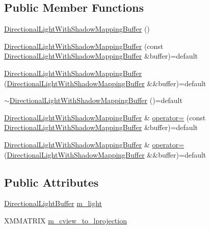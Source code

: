 \subsection*{Public Member Functions}
\begin{DoxyCompactItemize}
\item 
\hyperlink{structmage_1_1_directional_light_with_shadow_mapping_buffer_a4657f8c201fda21988dea072c70615bb}{Directional\+Light\+With\+Shadow\+Mapping\+Buffer} ()
\item 
\hyperlink{structmage_1_1_directional_light_with_shadow_mapping_buffer_afc29c8403c453f50181ac8675cf89407}{Directional\+Light\+With\+Shadow\+Mapping\+Buffer} (const \hyperlink{structmage_1_1_directional_light_with_shadow_mapping_buffer}{Directional\+Light\+With\+Shadow\+Mapping\+Buffer} \&buffer)=default
\item 
\hyperlink{structmage_1_1_directional_light_with_shadow_mapping_buffer_aacd039c19b590d9d238ed1ec90d25721}{Directional\+Light\+With\+Shadow\+Mapping\+Buffer} (\hyperlink{structmage_1_1_directional_light_with_shadow_mapping_buffer}{Directional\+Light\+With\+Shadow\+Mapping\+Buffer} \&\&buffer)=default
\item 
\hyperlink{structmage_1_1_directional_light_with_shadow_mapping_buffer_aaf69f9a370b547844fe51ccebc791876}{$\sim$\+Directional\+Light\+With\+Shadow\+Mapping\+Buffer} ()=default
\item 
\hyperlink{structmage_1_1_directional_light_with_shadow_mapping_buffer}{Directional\+Light\+With\+Shadow\+Mapping\+Buffer} \& \hyperlink{structmage_1_1_directional_light_with_shadow_mapping_buffer_a9a166d9ce2e74442b98e0d02bcbf18b8}{operator=} (const \hyperlink{structmage_1_1_directional_light_with_shadow_mapping_buffer}{Directional\+Light\+With\+Shadow\+Mapping\+Buffer} \&buffer)=default
\item 
\hyperlink{structmage_1_1_directional_light_with_shadow_mapping_buffer}{Directional\+Light\+With\+Shadow\+Mapping\+Buffer} \& \hyperlink{structmage_1_1_directional_light_with_shadow_mapping_buffer_a19765ecbd12d4f346269a22791d5347c}{operator=} (\hyperlink{structmage_1_1_directional_light_with_shadow_mapping_buffer}{Directional\+Light\+With\+Shadow\+Mapping\+Buffer} \&\&buffer)=default
\end{DoxyCompactItemize}
\subsection*{Public Attributes}
\begin{DoxyCompactItemize}
\item 
\hyperlink{structmage_1_1_directional_light_buffer}{Directional\+Light\+Buffer} \hyperlink{structmage_1_1_directional_light_with_shadow_mapping_buffer_a911c958b0e442c927f6e8f8f73d9dbe1}{m\+\_\+light}
\item 
X\+M\+M\+A\+T\+R\+IX \hyperlink{structmage_1_1_directional_light_with_shadow_mapping_buffer_a73101e32d19de54846c3075b45ab5566}{m\+\_\+cview\+\_\+to\+\_\+lprojection}
\end{DoxyCompactItemize}

